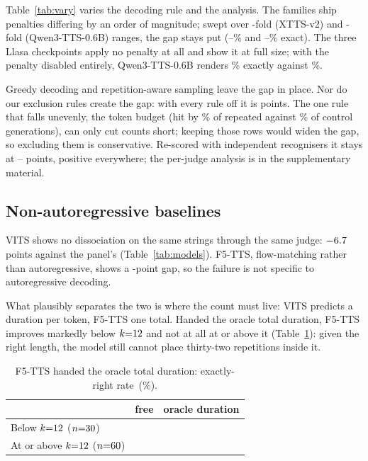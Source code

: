 \documentclass{article}
\newcommand{\tabsize}{\small}
\begin{document}
Table~\ref{tab:vary} varies the decoding rule and the analysis. The families ship penalties differing by an order of magnitude; swept
over \PenFold{}-fold (XTTS-v2) and \PenQFold{}-fold (Qwen3-TTS-0.6B)
ranges, the gap stays put (\PenRepLo{}--\PenRepHi{}\% and
\PenQRepLo{}--\PenQRepHi{}\% exact). The three Llasa checkpoints apply no
penalty at all and show it at full size; with the penalty disabled
entirely, Qwen3-TTS-0.6B renders \PenZeroRep{}\% exactly against
\PenZeroCtl{}\%.

Greedy decoding and repetition-aware sampling leave the gap in place. Nor do our exclusion rules create the gap: with every rule off it is
\ExSensAll{} points. The one rule that falls unevenly, the token budget
(hit by \ExclCapRep{}\% of repeated against \ExclCapCtl{}\% of control
generations), can
only cut counts short; keeping those rows would widen the gap, so
excluding them is conservative. Re-scored
with \IndNJudges{} independent recognisers it stays at
\IndGapLo{}--\IndGapHi{} points, positive everywhere; the per-judge
analysis is in the supplementary material.

\subsection{Non-autoregressive baselines}

VITS shows no dissociation on the same strings through the same judge:
$-6.7{}$ points against the panel's \ARPoolGap{}
(Table~\ref{tab:models}). F5-TTS, flow-matching rather than
autoregressive, shows a \FivettsGap{}-point
gap, so the failure is not specific to autoregressive decoding.

What plausibly separates the two is where the count must live: VITS
predicts a duration per token, F5-TTS one total. Handed the oracle total duration, F5-TTS improves markedly below
$k{=}12{}$ and not at all at or above it (Table~\ref{tab:dur}):
given the right length, the model still cannot place thirty-two
repetitions inside it.

\begin{table}[t]
\centering
\caption{F5-TTS handed the oracle total duration: exactly-right
rate~(\%).}
\label{tab:dur}
{\tabsize\setlength{\tabcolsep}{5pt}
\begin{tabular}{lrr}
\toprule
 & free & oracle duration \\
\midrule
Below $k{=}12{}$ ($n{=}30{}$)      & \DurLoFree{} & \DurLoFixed{} \\
At or above $k{=}12{}$ ($n{=}60{}$) & \DurHiFree{} & \DurHiFixed{} \\
\bottomrule
\end{tabular}}
\end{table}
\end{document}
